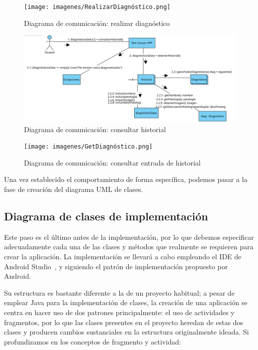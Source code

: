  \begin{figure}[H]
 	\centering
 	\texttt{[image: imagenes/RealizarDiagnóstico.png]}
 	\caption{Diagrama de comunicación: realizar diagnóstico}
 	\label{fig:com4}
 \end{figure}
 
  \begin{figure}[H]
 	\centering
 	\includegraphics[scale = 0.75]{imagenes/HistorialSec.png}
 	\caption{Diagrama de comunicación: consultar historial}
 	\label{fig:com5}
 \end{figure}
 
 
   \begin{figure}[H]
 	\centering
 	\texttt{[image: imagenes/GetDiagnóstico.png]}
 	\caption{Diagrama de comunicación: consultar entrada de historial}
 	\label{fig:com6}
 \end{figure}
 
 Una vez establecido el comportamiento de forma específica, podemos pasar a la fase de creación del diagrama UML de clases.
 
 \subsection{Diagrama de clases de implementación}
 Este paso es el último antes de la implementación, por lo que debemos especificar adecuadamente cada una de las clases y métodos que realmente se requieren para crear la aplicación. La implementación se llevará a cabo empleando el IDE de Android Studio~\cite{androidstudio}, y siguiendo el patrón de implementación propuesto por Android.
  
 Su estructura es bastante diferente a la de un proyecto habitual; a pesar de emplear Java \cite{javalang} para la implementación de clases, la creación de una aplicación se centra en hacer uso de dos patrones principalmente: el uso de actividades y fragmentos, por lo que las clases presentes en el proyecto heredan de estas dos clases y producen cambios sustanciales en la estructura originalmente ideada. Si profundizamos en los conceptos de fragmento y actividad:
 
